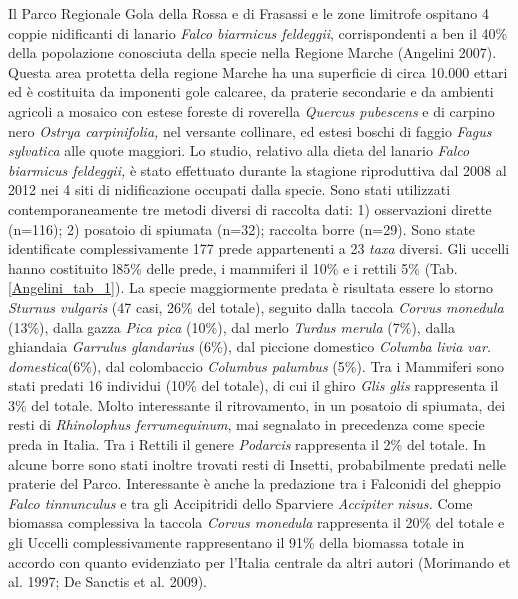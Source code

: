 \vspace{1cm}
Il Parco Regionale Gola della Rossa e di Frasassi e le zone limitrofe
ospitano 4 coppie nidificanti di lanario \textit{Falco biarmicus
feldeggii}, corrispondenti a ben il 40\% della popolazione conosciuta
della specie nella Regione Marche (Angelini 2007). Questa area protetta
della regione Marche ha una superficie di circa 10.000 ettari ed \`e
costituita da imponenti gole calcaree, da praterie secondarie e da
ambienti agricoli a mosaico con estese foreste di roverella
\textit{Quercus pubescens} e di carpino nero \textit{Ostrya
carpinifolia,} nel versante collinare, ed estesi boschi di faggio
\textit{Fagus sylvatica} alle quote maggiori. Lo studio, relativo alla
dieta del lanario \textit{Falco biarmicus feldeggii,} \`e stato
effettuato durante la stagione riproduttiva dal 2008 al 2012 nei 4 siti
di nidificazione occupati dalla specie. Sono stati utilizzati
contemporaneamente tre metodi diversi di raccolta dati: 1) osservazioni
dirette (n=116); 2) posatoio di spiumata (n=32); raccolta borre (n=29).
Sono state identificate complessivamente 177 prede appartenenti a 23
\textit{taxa} diversi. Gli uccelli hanno costituito
l{\textquotesingle}85\% delle prede, i mammiferi il 10\% e i rettili
5\% (Tab. \ref{Angelini_tab_1}). La specie maggiormente predata \`e risultata essere lo
storno \textit{Sturnus vulgaris }(47 casi, 26\% del totale), seguito
dalla taccola \textit{Corvus monedula} (13\%), dalla gazza \textit{Pica
pica} (10\%), dal merlo \textit{Turdus merula }(7\%), dalla ghiandaia
\textit{Garrulus glandarius }(6\%), dal piccione domestico
\textit{Columba livia var. domestica}(6\%), dal colombaccio \textit{Columbus
palumbus} (5\%). Tra i Mammiferi sono stati predati 16 individui (10\%
del totale), di cui il ghiro \textit{Glis glis} rappresenta il 3\% del
totale. Molto interessante il ritrovamento, in un posatoio di spiumata,
dei resti di \textit{Rhinolophus ferrumequinum}, mai segnalato in
precedenza come specie preda in Italia. Tra i Rettili il genere
\textit{Podarcis} rappresenta il 2\% del totale. In alcune borre sono
stati inoltre trovati resti di Insetti, probabilmente predati nelle
praterie del Parco. Interessante \`e anche la predazione tra i
Falconidi del gheppio \textit{Falco tinnunculus} e tra gli Accipitridi
dello Sparviere \textit{Accipiter nisus. }Come biomassa complessiva la
taccola \textit{Corvus monedula} rappresenta il 20\% del totale e gli
Uccelli complessivamente rappresentano il 91\% della biomassa totale in
accordo con quanto evidenziato per l{\textquoteright}Italia centrale da
altri autori (Morimando et al. 1997; De Sanctis et al. 2009).

